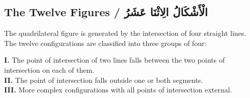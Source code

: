 \documentclass[11pt,a4paper]{article}
\theoremstyle{plain}
\theoremstyle{definition}
\theoremstyle{remark}
\newcommand{\ar}[1]{{\arabicfont\beginR #1\endR}}
\begin{document}
\subsection{The Twelve Figures / \ar{الْأَشْكَالُ الِاثْنَا عَشَرُ}}
\label{sec:12figs}

\noindent The quadrilateral figure is generated by the intersection of four
straight lines. The twelve configurations are classified into three groups of
four:

\begin{center}
\textbf{I.} The point of intersection of two lines falls between the two
points of intersection on each of them.\\[0.2cm]
\textbf{II.} The point of intersection falls outside one or both segments.\\[0.2cm]
\textbf{III.} More complex configurations with all points of intersection
external.\\[0.2cm]
\end{center}
\end{document}
